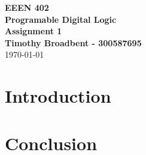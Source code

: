 \documentclass[10pt, a4paper]{article}
\begin{document}
\begin{titlepage}
  \pagecolor{lightgrey}
  \color{darkgrey}
\begin{flushleft}
{\fontsize{24pt}{28.8pt}\selectfont\bfseries  EEEN 402 \\}
{\fontsize{42pt}{42pt}\selectfont\bfseries Programable Digital Logic \\}
{\fontsize{24pt}{28.8pt}\selectfont\bfseries Assignment 1 \\}
\vspace*{\fill}
{\fontsize{14pt}{16.8pt}\selectfont\bfseries Timothy Broadbent - 300587695\\}
\vspace{0.5cm}
{\fontsize{14pt}{16.8pt}\selectfont\today}

\end{flushleft}




\end{titlepage}
\pagecolor{shuttlewhite}
\color{warmblack}
\clearpage

\section{Introduction}


\section{Conclusion}
\end{document}
